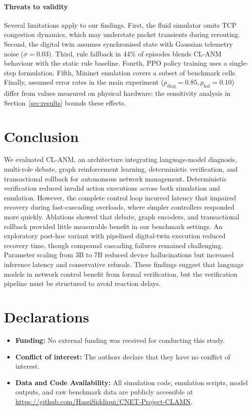 \documentclass[sn-mathphys,Numbered]{sn-jnl}
\begin{document}
\paragraph{Threats to validity} Several limitations apply to our findings. First, the fluid simulator omits TCP congestion dynamics, which may understate packet transients during rerouting. Second, the digital twin assumes synchronised state with Gaussian telemetry noise ($\sigma=0.03$). Third, rule fallback in 44\% of episodes blends CL-ANM behaviour with the static rule baseline. Fourth, PPO policy training uses a single-step formulation. Fifth, Mininet emulation covers a subset of benchmark cells. Finally, assumed error rates in the main experiment ($p_\text{diag}=0.85, p_\text{hal}=0.10$) differ from values measured on physical hardware; the sensitivity analysis in Section~\ref{sec:results} bounds these effects.

\FloatBarrier
\section{Conclusion}\label{sec:conclusion}
We evaluated CL-ANM, an architecture integrating language-model diagnosis, multi-role debate, graph reinforcement learning, deterministic verification, and transactional rollback for autonomous network management. Deterministic verification reduced invalid action executions across both simulation and emulation. However, the complete control loop incurred latency that impaired recovery during fast-cascading overloads, where simpler controllers responded more quickly. Ablations showed that debate, graph encoders, and transactional rollback provided little measurable benefit in our benchmark settings. An exploratory post-hoc variant with pipelined digital-twin execution reduced recovery time, though compound cascading failures remained challenging. Parameter scaling from 3B to 7B reduced device hallucinations but increased inference latency and conservative refusals. These findings suggest that language models in network control benefit from formal verification, but the verification pipeline must be structured to avoid reaction delays.

\section*{Declarations}

\begin{itemize}
\item \textbf{Funding:} No external funding was received for conducting this study.
\item \textbf{Conflict of interest:} The authors declare that they have no conflict of interest.
\item \textbf{Data and Code Availability:} All simulation code, emulation scripts, model outputs, and raw benchmark data are publicly accessible at \url{https://github.com/HassiSiddiqui/CNET-Project-CLAMN}.
\end{itemize}
\end{document}
